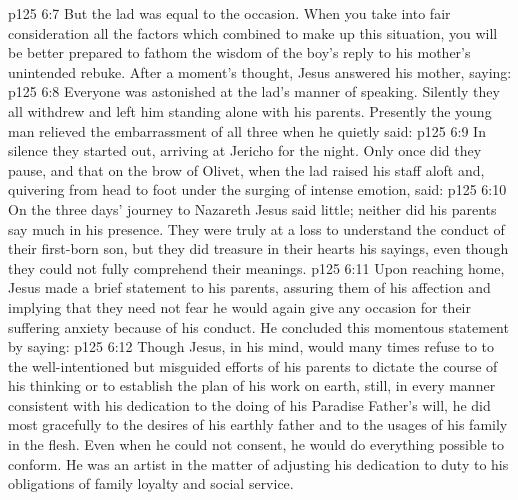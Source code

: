 \vs p125 6:7 But the lad was equal to the occasion. When you take into fair consideration all the factors which combined to make up this situation, you will be better prepared to fathom the wisdom of the boy’s reply to his mother’s unintended rebuke. After a moment’s thought, Jesus answered his mother, saying: 
\vs p125 6:8 Everyone was astonished at the lad’s manner of speaking. Silently they all withdrew and left him standing alone with his parents. Presently the young man relieved the embarrassment of all three when he quietly said: 
\vs p125 6:9 In silence they started out, arriving at Jericho for the night. Only once did they pause, and that on the brow of Olivet, when the lad raised his staff aloft and, quivering from head to foot under the surging of intense emotion, said: 
\vs p125 6:10 On the three days’ journey to Nazareth Jesus said little; neither did his parents say much in his presence. They were truly at a loss to understand the conduct of their first\hyp{}born son, but they did treasure in their hearts his sayings, even though they could not fully comprehend their meanings.
\vs p125 6:11 Upon reaching home, Jesus made a brief statement to his parents, assuring them of his affection and implying that they need not fear he would again give any occasion for their suffering anxiety because of his conduct. He concluded this momentous statement by saying: 
\vs p125 6:12 \pc Though Jesus, in his mind, would many times refuse to  to the well\hyp{}intentioned but misguided efforts of his parents to dictate the course of his thinking or to establish the plan of his work on earth, still, in every manner consistent with his dedication to the doing of his Paradise Father’s will, he did most gracefully  to the desires of his earthly father and to the usages of his family in the flesh. Even when he could not consent, he would do everything possible to conform. He was an artist in the matter of adjusting his dedication to duty to his obligations of family loyalty and social service.
